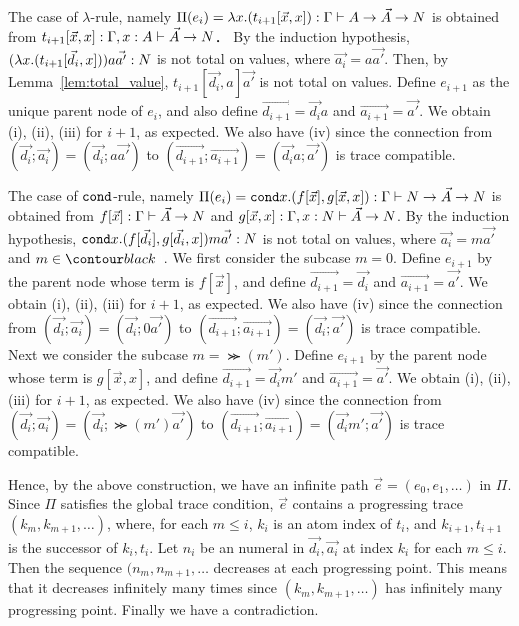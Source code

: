\documentclass{article}
\newenvironment{proof}[1][Proof]{\begin{trivlist}
\item[\hskip \labelsep {\bfseries #1}]}{\end{trivlist}}
\begin{document}
\begin{proof}
  The case of $\lambda$-rule, namely
  $\Pi(e_i) = \lambda x.(t_{i+1}[\vec{x},x]):\Gamma\vdash A \rightarrow \vec{A} \rightarrow {N}$ is obtained from
  $t_{i+1}[\vec{x},x]:\Gamma,x:A\vdash \vec{A}\rightarrow{N}$．
  By the induction hypothesis, $(\lambda x.(t_{i+1}[\vec{d_i},x]))a\vec{a'}:{N}$ is not total on values,
  where $\vec{a_i} = a\vec{a'}$.
  Then, by Lemma~\ref{lem:total_value}, $t_{i+1}[\vec{d_i},a]\vec{a'}$ is not total on values. 
  Define $e_{i+1}$ as the unique parent node of $e_i$, and
  also define $\vec{d_{i+1}} = \vec{d_i}a$ and $\vec{a_{i+1}} = \vec{a'}$. 
  We obtain (i), (ii), (iii) for $i+1$, as expected.
  We also have (iv) since the connection from 
  $(\vec{d_i};\vec{a_i}) = (\vec{d_i};a\vec{a'})$ to $(\vec{d_{i+1}};\vec{a_{i+1}}) = (\vec{d_i}a;\vec{a'})$ is
  trace compatible. 
  
  The case of ${\tt cond}$-rule, namely
  $\Pi(e_i) = {\tt cond} x.(f[\vec{x}],g[\vec{x},x]):\Gamma\vdash {N}\rightarrow\vec{A}\rightarrow{N}$
  is obtained from 
  $f[\vec{x}]:\Gamma\vdash \vec{A}\rightarrow{N}$
  and
  $g[\vec{x},x]:\Gamma,x:{N}\vdash \vec{A}\rightarrow{N}$. 
  By the induction hypothesis, ${\tt cond} x.(f[\vec{d_i}],g[\vec{d_i},x])m\vec{a'}:{N}$ is not total on values,
  where $\vec{a_i} = m\vec{a'}$ and $m \in \Nat$.
  We first consider the subcase $m=0$.
  Define $e_{i+1}$ by the parent node whose term is $f[\vec{x}]$,
  and define $\vec{d_{i+1}} = \vec{d_i}$ and $\vec{a_{i+1}} = \vec{a'}$. 
  We obtain (i), (ii), (iii) for $i+1$, as expected. 
  We also have (iv) since the connection from 
  $(\vec{d_i};\vec{a_i})=(\vec{d_i};0\vec{a'})$ to $(\vec{d_{i+1}};\vec{a_{i+1}}) = (\vec{d_i};\vec{a'})$
  is trace compatible. 
  Next we consider the subcase $m=\Succ(m')$. 
  Define $e_{i+1}$ by the parent node whose term is $g[\vec{x},x]$,
  and define $\vec{d_{i+1}} = \vec{d_i}m'$ and $\vec{a_{i+1}} = \vec{a'}$. 
  We obtain (i), (ii), (iii) for $i+1$, as expected.
  We also have (iv) since the connection from 
  $(\vec{d_i};\vec{a_i})=(\vec{d_i};\Succ(m')\vec{a'})$ to $(\vec{d_{i+1}};\vec{a_{i+1}}) = (\vec{d_i}m';\vec{a'})$
  is trace compatible. 

  Hence, by the above construction, we have an infinite path $\vec{e} = (e_0,e_1,\ldots)$ in $\Pi$.
  Since $\Pi$ satisfies the global trace condition, $\vec{e}$ contains a progressing trace
  $(k_{m},k_{m+1},\ldots)$, where, for each $m\le i$, $k_i$ is an atom index of $t_i$, 
  and $k_{i+1},t_{i+1}$ is the successor of $k_i,t_i$. 
  Let $n_i$ be an numeral in $\vec{d_i},\vec{a_i}$ at index $k_i$ for each $m\le i$.
  Then the sequence $(n_m,n_{m+1},\ldots$ decreases at each progressing point.
  This means that it decreases infinitely many times
  since $(k_{m},k_{m+1},\ldots)$ has infinitely many progressing point.
  Finally we have a contradiction. 
  
\end{proof}
\end{document}
